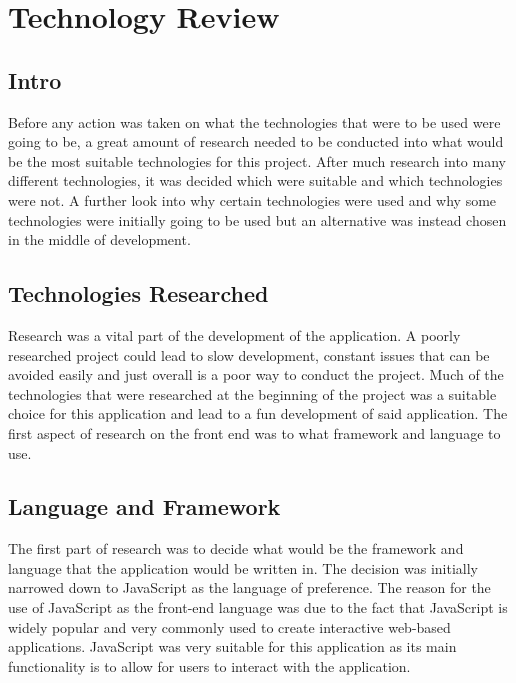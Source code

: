 \chapter{Technology Review}

\section{Intro}

Before any action was taken on what the technologies that were to be used were going to be, a great amount of research needed to be conducted into what would be the most suitable technologies for this project. After much research into many different technologies, it was decided which were suitable and which technologies were not. A further look into why certain technologies were used and why some technologies were initially going to be used but an alternative was instead chosen in the middle of development. \\

\section{Technologies Researched}

Research was a vital part of the development of the application. A poorly researched project could lead to slow development, constant issues that can be avoided easily and just overall is a poor way to conduct the project. Much of the technologies that were researched at the beginning of the project was a suitable choice for this application and lead to a fun development of said application. The first aspect of research on the front end was to what framework and language to use. \\

\section{Language and Framework}

The first part of research was to decide what would be the framework and language that the application would be written in. The decision was initially narrowed down to JavaScript as the language of preference. The reason for the use of JavaScript as the front-end language was due to the fact that JavaScript is widely popular and very commonly used to create interactive web-based applications.\cite{Javascript} JavaScript was very suitable for this application as its main functionality is to allow for users to interact with the application. \\

